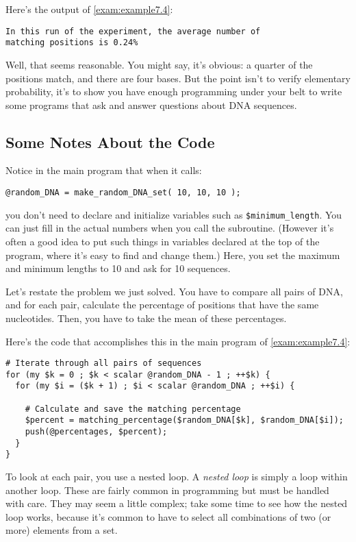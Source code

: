 Here's the output of \autoref{exam:example7.4}:

\begin{lstlisting}
In this run of the experiment, the average number of 
matching positions is 0.24%
\end{lstlisting}

Well, that seems reasonable. You might say, it's obvious: a quarter of the positions match, and there are four bases. But the point isn't to verify elementary probability, it's to show you have enough programming under your belt to write some programs that ask and answer questions about DNA sequences. 

\subsection{Some Notes About the Code}
Notice in the main program that when it calls:

\begin{lstlisting}
@random_DNA = make_random_DNA_set( 10, 10, 10 );
\end{lstlisting}

you don't need to declare and initialize variables such as \verb|$minimum_length|. You can just fill in the actual numbers when you call the subroutine. (However it's often a good idea to put such things in variables declared at the top of the program, where it's easy to find and change them.) Here, you set the maximum and minimum lengths to 10 and ask for 10 sequences.

Let's restate the problem we just solved. You have to compare all pairs of DNA, and for each pair, calculate the percentage of positions that have the same nucleotides. Then, you have to take the mean of these percentages.

Here's the code that accomplishes this in the main program of \autoref{exam:example7.4}:

\begin{lstlisting}
# Iterate through all pairs of sequences
for (my $k = 0 ; $k < scalar @random_DNA - 1 ; ++$k) {
  for (my $i = ($k + 1) ; $i < scalar @random_DNA ; ++$i) {

    # Calculate and save the matching percentage
    $percent = matching_percentage($random_DNA[$k], $random_DNA[$i]);
    push(@percentages, $percent);
  }
}
\end{lstlisting}

To look at each pair, you use a nested loop. A \textit{nested loop} is simply a loop within another loop. These are fairly common in programming but must be handled with care. They may seem a little complex; take some time to see how the nested loop works, because it's common to have to select all combinations of two (or more) elements from a set.

